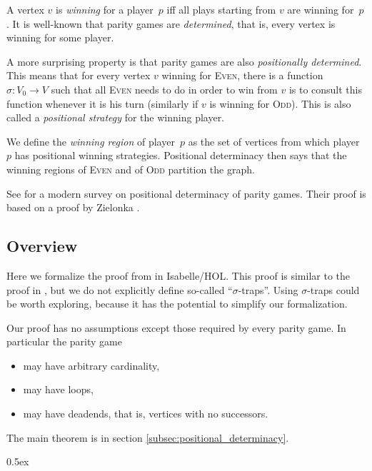 \documentclass[11pt,a4paper]{scrartcl}
\newcommand{\Even}{\textsc{Even}\xspace}
\newcommand{\Odd}{\textsc{Odd}\xspace}
\begin{document}
A vertex $v$ is \emph{winning} for a player~$p$ iff all plays starting
from $v$ are winning for~$p$.  It is well-known that parity games are
\emph{determined}, that is, every vertex is winning for some player.

A more surprising property is that parity games are also
\emph{positionally determined}.  This means that for every vertex $v$
winning for \Even, there is a function $\sigma: V_0 \to V$ such that
all \Even needs to do in order to win from $v$ is to consult this
function whenever it is his turn (similarly if $v$ is winning for
\Odd).  This is also called a \emph{positional strategy} for the
winning player.

We define the \emph{winning region} of player~$p$ as the set of
vertices from which player~$p$ has positional winning strategies.
Positional determinacy then says that the winning regions of \Even and
of \Odd partition the graph.

See \cite{automata2002/kuesters} for a modern survey on positional
determinacy of parity games.  Their proof is based on a proof by
Zielonka \cite{zielonka1998}.

\subsection{Overview}

Here we formalize the proof from \cite{kreutzer2015} in Isabelle/HOL.
This proof is similar to the proof in \cite{automata2002/kuesters},
but we do not explicitly define so-called ``$\sigma$-traps''.  Using
$\sigma$-traps could be worth exploring, because it has the potential
to simplify our formalization.

Our proof has no assumptions except those required by every parity
game.  In particular the parity game
\begin{itemize}
\item may have arbitrary cardinality,
\item may have loops,
\item may have deadends, that is, vertices with no successors.
\end{itemize}

The main theorem is in section \ref{subsec:positional_determinacy}.

\parindent 0pt\parskip 0.5ex



\clearpage
{}
{}


\end{document}

